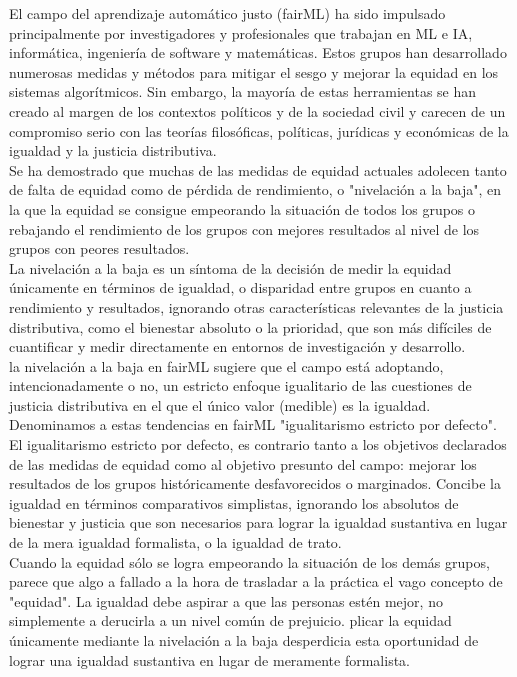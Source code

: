 El campo del aprendizaje automático justo (fairML) ha sido impulsado principalmente por investigadores y profesionales que trabajan en ML e IA, informática, ingeniería de software y matemáticas. Estos grupos han desarrollado numerosas medidas y métodos para mitigar el sesgo y mejorar la equidad en los sistemas algorítmicos. Sin embargo, la mayoría de estas herramientas se han creado al margen de los contextos políticos y de la sociedad civil y carecen de un compromiso serio con las teorías filosóficas, políticas, jurídicas y económicas de la igualdad y la justicia distributiva.\\

Se ha demostrado que muchas de las medidas de equidad actuales adolecen tanto de falta de equidad como de pérdida de rendimiento, o "nivelación a la baja", en la que la equidad se consigue empeorando la situación de todos los grupos o rebajando el rendimiento de los grupos con mejores resultados al nivel de los grupos con peores resultados.\\

La nivelación a la baja es un síntoma de la decisión de medir la equidad únicamente en términos de igualdad, o disparidad entre grupos en cuanto a rendimiento y resultados, ignorando otras características relevantes de la justicia distributiva, como el bienestar absoluto o la prioridad, que son más difíciles de cuantificar y medir directamente en entornos de investigación y desarrollo.\\

la nivelación a la baja en fairML sugiere que el campo está adoptando, intencionadamente o no, un estricto enfoque igualitario de las cuestiones de justicia distributiva en el que el único valor (medible) es la igualdad. Denominamos a estas tendencias en fairML "igualitarismo estricto por defecto". El igualitarismo estricto por defecto, es contrario tanto a los objetivos declarados de las medidas de equidad como al objetivo presunto del campo: mejorar los resultados de los grupos históricamente desfavorecidos o marginados.  Concibe la igualdad en términos comparativos simplistas, ignorando los absolutos de bienestar y justicia que son necesarios para lograr la igualdad sustantiva en lugar de la mera igualdad formalista, o la igualdad de trato.\\

Cuando la equidad sólo se logra empeorando la situación de los demás grupos, parece que algo a fallado a la hora de trasladar a la práctica el vago concepto de "equidad". La igualdad debe aspirar a que las personas estén mejor, no simplemente a derucirla a un nivel común de prejuicio. plicar la equidad únicamente mediante la nivelación a la baja desperdicia esta oportunidad de lograr una igualdad sustantiva en lugar de meramente formalista. \\


